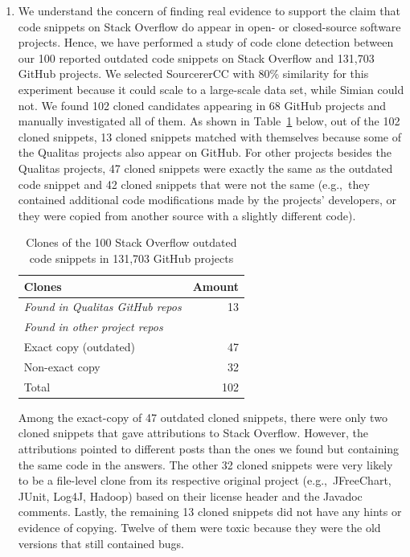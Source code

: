 \documentclass[a4paper,twoside,10pt]{reviewresponse}
\begin{document}
\begin{enumerate} \item We understand the concern of finding real evidence to
	support the claim that code snippets on Stack Overflow do appear in open- or
	closed-source software projects. Hence, we have performed a study of code clone
	detection between our 100 reported outdated code snippets on Stack Overflow and
	131,703 GitHub projects. We selected SourcererCC with 80\% similarity for this
	experiment because it could scale to a large-scale data set, while Simian could
	not. We found 102 cloned candidates appearing in 68 GitHub projects and manually
	investigated all of them. As shown in Table~\ref{tab:outdated_github} below, out
	of the 102 cloned snippets, 13 cloned snippets matched with
	themselves because some of the Qualitas projects also appear on GitHub. For
	other projects besides the Qualitas projects, 47 cloned snippets
	were exactly the same as the outdated code snippet and 42 cloned snippets that
	were not the same (e.g.,~they contained additional code modifications
	made by the projects' developers, or they were copied from another source with a
	slightly different code).
	
	\begin{table}[H]
		\centering
		\begin{tabular}{lr}
			\toprule
			Clones & Amount \\
			\midrule
			\textit{Found in Qualitas GitHub repos} & 13 \\
			\midrule
			\textit{Found in other project repos} & \\
			Exact copy (outdated) & 47 \\
			Non-exact copy & 32 \\
			\midrule
			Total & 102 \\
			\bottomrule
		\end{tabular}
		\label{tab:outdated_github}
		\caption{Clones of the 100 Stack Overflow outdated code snippets in 131,703 GitHub projects}
	\end{table}

Among the exact-copy of 47 outdated cloned snippets, there were only two cloned
snippets that gave attributions to Stack Overflow. However, the attributions
pointed to different posts than the ones we found but containing the same code
in the answers. The other 32 cloned snippets were very likely to be a
file-level clone from its respective original project (e.g.,~JFreeChart, JUnit,
Log4J, Hadoop) based on their license header and the Javadoc comments. Lastly,
the remaining 13 cloned snippets did not have any hints or evidence of copying.
Twelve of them were toxic because they were the old versions that still
contained bugs.


\end{enumerate}
\end{document}

